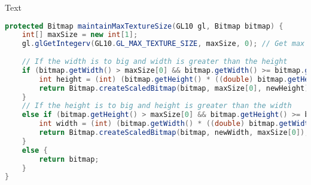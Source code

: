 Text

\begin{lstlisting}[language=java,caption={Scales the bitmap if the size of it is not supported on the current device.},label=lst:maintain] 
protected Bitmap maintainMaxTextureSize(GL10 gl, Bitmap bitmap) {
    int[] maxSize = new int[1];
    gl.glGetIntegerv(GL10.GL_MAX_TEXTURE_SIZE, maxSize, 0); // Get max supported texture size on this device
    
    // If the width is to big and width is greater than the height
    if (bitmap.getWidth() > maxSize[0] && bitmap.getWidth() >= bitmap.getHeight()) {
        int height = (int) (bitmap.getHeight() * ((double) bitmap.getHeight() / maxSize[0]));
        return Bitmap.createScaledBitmap(bitmap, maxSize[0], newHeight);
    }
    // If the height is to big and height is greater than the width
    else if (bitmap.getHeight() > maxSize[0] && bitmap.getHeight() >= bitmap.getWidth()) {
        int width = (int) (bitmap.getWidth() * ((double) bitmap.getWidth() / maxSize[0]));
        return Bitmap.createScaledBitmap(bitmap, newWidth, maxSize[0]);
    }
    else {
        return bitmap;
    }
}
\end{lstlisting}

